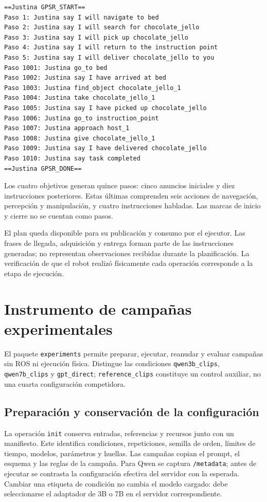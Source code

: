 {\scriptsize
\begin{verbatim}
==Justina GPSR_START==
Paso 1: Justina say I will navigate to bed
Paso 2: Justina say I will search for chocolate_jello
Paso 3: Justina say I will pick up chocolate_jello
Paso 4: Justina say I will return to the instruction point
Paso 5: Justina say I will deliver chocolate_jello to you
Paso 1001: Justina go_to bed
Paso 1002: Justina say I have arrived at bed
Paso 1003: Justina find_object chocolate_jello_1
Paso 1004: Justina take chocolate_jello_1
Paso 1005: Justina say I have picked up chocolate_jello
Paso 1006: Justina go_to instruction_point
Paso 1007: Justina approach host_1
Paso 1008: Justina give chocolate_jello_1
Paso 1009: Justina say I have delivered chocolate_jello
Paso 1010: Justina say task completed
==Justina GPSR_DONE==
\end{verbatim}
}

Los cuatro objetivos generan quince pasos: cinco anuncios iniciales y
diez instrucciones posteriores. Estas últimas comprenden seis acciones
de navegación, percepción y manipulación, y cuatro instrucciones
habladas. Las marcas de inicio y cierre no se cuentan como pasos.

El plan queda disponible para su publicación y consumo por el ejecutor.
Las frases de llegada, adquisición y entrega forman parte de las
instrucciones generadas; no representan observaciones recibidas durante
la planificación. La verificación de que el robot realizó físicamente
cada operación corresponde a la etapa de ejecución.

\section{Instrumento de campañas experimentales}
\label{sec:instrumento_experimental_impl}

El paquete \texttt{experiments} permite preparar, ejecutar, reanudar y
evaluar campañas sin ROS ni ejecución física. Distingue las condiciones
\texttt{qwen3b\_clips}, \texttt{qwen7b\_clips} y
\texttt{gpt\_direct}; \texttt{reference\_\allowbreak clips} constituye un control
auxiliar, no una cuarta configuración competidora.

\subsection{Preparación y conservación de la configuración}

La operación \texttt{init} conserva entradas, referencias y recursos
junto con un manifiesto. Este identifica condiciones, repeticiones,
semilla de orden, límites de tiempo, modelos, parámetros y huellas.
Las campañas copian el prompt, el esquema y las reglas de la campaña.
Para Qwen se captura \texttt{/metadata}; antes de ejecutar se contrasta
la configuración efectiva del servidor con la esperada. Cambiar una
etiqueta de condición no cambia el modelo cargado: debe seleccionarse
el adaptador de 3B o 7B en el servidor correspondiente.

